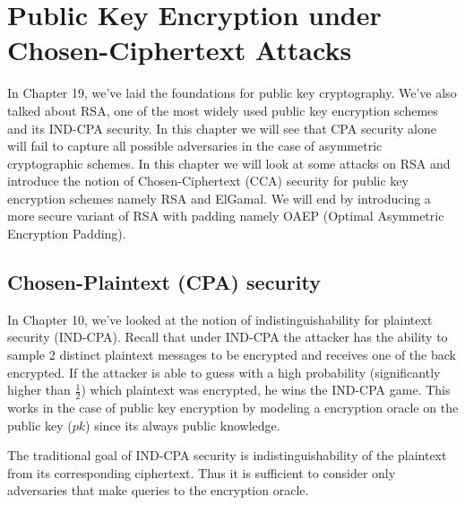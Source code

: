 \section{Public Key Encryption under Chosen-Ciphertext Attacks}
\label{sec:pke}

In Chapter 19, we've laid the foundations for public key cryptography. We've also talked about RSA, one of the most widely used public key encryption schemes and its IND-CPA security. In this chapter we will see that CPA security alone will fail to capture all possible adversaries in the case of asymmetric cryptographic schemes. In this chapter we will look at some attacks on RSA and introduce the notion of Chosen-Ciphertext (CCA) security for public key encryption schemes namely RSA and ElGamal.  
We will end by introducing a more secure variant of RSA with padding namely OAEP (Optimal Asymmetric Encryption Padding). 

\subsection{Chosen-Plaintext (CPA) security}
In Chapter 10, we've looked at the notion of indistinguishability for plaintext security (IND-CPA).  
Recall that under IND-CPA the attacker has the ability to sample 2 distinct plaintext messages to be encrypted and receives one of the back encrypted. If the attacker is able to guess with a high probability (significantly higher than \( \frac{1}{2} \)) which plaintext was encrypted, he wins the IND-CPA game. This works in the case of public key encryption by modeling a encryption oracle on the public key (\(pk\)) since its always public knowledge. 

\indent The traditional goal of IND-CPA security is indistinguishability of the plaintext from its corresponding ciphertext. Thus it is sufficient to consider only adversaries that make queries to the encryption oracle. \newline
 
\begin{center}
\end{center}

